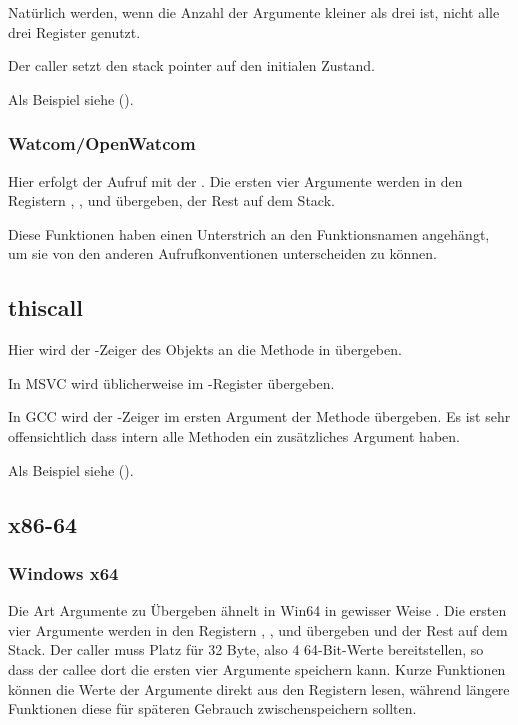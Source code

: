 Natürlich werden, wenn die Anzahl der Argumente kleiner als drei ist, nicht alle drei
Register genutzt.

Der \gls{caller} setzt den \gls{stack pointer} auf den initialen Zustand.

Als Beispiel siehe ().

\subsubsection{Watcom/OpenWatcom}

Hier erfolgt der Aufruf mit der .
Die ersten vier Argumente werden in den Registern \EAX, \EDX, \EBX und \ECX übergeben,
der Rest auf dem Stack.

Diese Funktionen haben einen Unterstrich an den Funktionsnamen angehängt, um sie von
den anderen Aufrufkonventionen unterscheiden zu können.

\subsection{thiscall}

Hier wird der \ITthis-Zeiger des Objekts an die Methode in \Cpp übergeben.

In MSVC wird \ITthis üblicherweise im \ECX-Register übergeben.

In GCC wird der \ITthis-Zeiger im ersten Argument der Methode übergeben.
Es ist sehr offensichtlich dass intern alle Methoden ein zusätzliches Argument haben.

Als Beispiel siehe ().

\subsection{x86-64}

\subsubsection{Windows x64}
\label{sec:callingconventions_win64}

Die Art Argumente zu Übergeben ähnelt in Win64 in gewisser Weise .
Die ersten vier Argumente werden in den Registern \RCX, \RDX,  und 
übergeben und der Rest auf dem Stack.
Der \gls{caller} muss Platz für 32 Byte, also 4 64-Bit-Werte bereitstellen, so
dass der \gls{callee} dort die ersten vier Argumente speichern kann.
Kurze Funktionen können die Werte der Argumente direkt aus den Registern lesen,
während längere Funktionen diese für späteren Gebrauch zwischenspeichern sollten.

